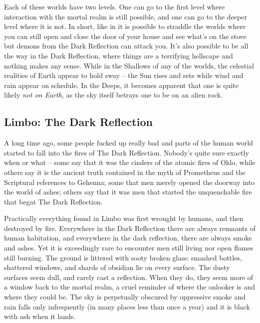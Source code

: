 Each of these worlds have two levels. One can go to the first level where interaction with the mortal realm is still possible, and one can go to the deeper level where it is not. In short, like in  it is possible to straddle the worlds where you can still open and close the door of your house and see what's on the stove but demons from the Dark Reflection can attack you. It's also possible to be all the way in the Dark Reflection, where things are a terrifying hellscape and nothing makes any sense. While in the Shallows of any of the worlds, the celestial realities of Earth appear to hold sway -- the Sun rises and sets while wind and rain appear on schedule. In the Deeps, it becomes apparent that one is quite likely \textit{not on Earth}, as the sky itself betrays one to be on an alien rock.

\subsection{Limbo: The Dark Reflection} 

A long time ago, some people fucked up really bad and parts of the human world started to fall into the fires of The Dark Reflection. Nobody's quite sure exactly when or what -- some say that it was the cinders of the atomic fires of Oklo, while others say it is the ancient truth contained in the myth of Prometheus and the Scriptural references to Gehenna; some that men merely opened the doorway into the world of ashes; others say that it was men that started the unquenchable fire that begat The Dark Reflection. 

Practically everything found in Limbo was first wrought by humans, and then destroyed by fire. Everywhere in the Dark Reflection there are always remnants of human habitation, and everywhere in the dark reflection, there are always smoke and ashes. Yet it is exceedingly rare to encounter men still living nor open flames still burning. The ground is littered with sooty broken glass: smashed bottles, shattered windows, and  shards of obsidian lie on every surface. The dusty surfaces seem dull, and rarely cast a reflection. When they do, they seem more of a window back to the mortal realm, a cruel reminder of where the onlooker is and where they could be. The sky is perpetually obscured by oppressive smoke and rain falls only infrequently (in many places less than once a year) and it is black with ash when it lands.


